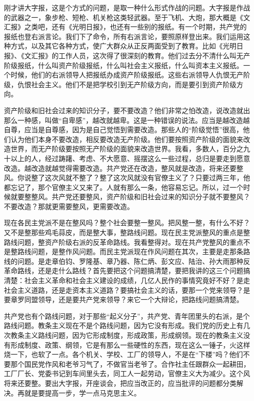 刚才讲大字报，这是个方式的问题，是取一种什么形式作战的问题。大字报是作战的武器之一，象步枪、短枪、机关枪这类轻武器。至于飞机、大炮，那大概是《文汇报》之类吧，还有《光明日报》，也还有一些别的报纸。有一个时期，共产党的报纸也登右派言论。我们下了命令，所有右派言论，要照原样登出来。我们运用这种方式，以及其它各种方式，使广大群众从正反两面受到了教育。比如《光明日报》、《文汇报》的工作人员，这次得了很深刻的教育。他们过去分不清什么叫无产阶级报纸，什么叫资产阶级报纸，什么叫社会主义报纸，什么叫资本主义报纸。一个时候，他们的右派领导人把报纸办成资产阶级报纸。这些右派领导人仇恨无产阶级，仇恨社会主义。他们不是把学校引到无产阶级方向，而是要引到资产阶级方向。

资产阶级和旧社会过来的知识分子，要不要改造？他们非常之怕改造，说改造就出那么一种感，叫做“自卑感”，越改就越卑。这是一种错误的说法。应当是越改造越自尊，应当是自尊感，因为是自己觉悟到需要改造。那些人的“阶级觉悟”很高，他们认为他们本身不要改造，相反要改造无产阶级。他们要按照资产阶级的面貌来改造世界，而无产阶级要按照无产阶级的面貌来改造世界。我看，多数人，百分之九十以上的人，经过踌躇、考虑、不大愿意、摇摆这么一些过程，总归是要走到愿意改造。越改造就越觉得需要改造。共产党还在改造，整风就是改造，将来还要整风。你说整了这次风就不整了？整了这次风就没有官僚主义了？只要过两三年，他都忘记了，那个官僚主义又来了。人就有那么一条，他容易忘记。所以，过一个时候就要整整风。共产党还要整风，资产阶级和旧社会过来的知识分子就不要整风？不要改造？那就更需要整风，更需要改造。

现在各民主党派不是在整风吗？整个社会要整一整风。把风整一整，有什么不好？又不是整那些鸡毛蒜皮，而是整大事，整路线问题。现在民主党派整风的重点是整路线问题，整资产阶级右派的反革命路线。我看整得对。现在共产党整风的重点不是整路线问题，是整作风问题。而民主党派现在作风问题在其次，主要是走那条路线的问题。是走章伯钧、罗隆基、章乃器、陈仁炳、彭文应、陆治、孙大雨那种反革命路线，还是走什么路线？首先要把这个问题搞清楚，要把我讲的这三个问题搞清楚：社会主义革命和社会主义建设的成绩，几亿人民作的事情究竟好不好？是走社会主义道路，还是走资本主义道路？要搞社会主义的话，要那一个党来领导？是要章罗同盟领导，还是要共产党来领导？来它一个大辩论，把路线问题搞清楚。

共产党也有个路线问题，对于那些“起义分子”，共产党、青年团里头的右派，是个路线问题。教条主义现在不是个路线问题，因为它没有形成。我们党的历史上有几次教条主义路线问题，因为它形成制度，形成政策，形成纲领。现在的教条主义没有形成制度、政策、纲领，它是有那么一些硬性的东西，现在这么一锤子，火这样烧一下，也软了一点。各个机关、学校、工厂的领导人，不是在“下楼”吗？他们不要那个国民党作风和老爷习气了，不做官当老爷了。合作社主任跟群众一起耕田，工厂厂长、党委书记到车间里头去，同工人一起劳动，官僚主义大为减少。这个风将来还要整。要出大字报，开座谈会，把应当改正的，应当批评的问题都分类解决。再就是要提高一步，学一点马克思主义。

